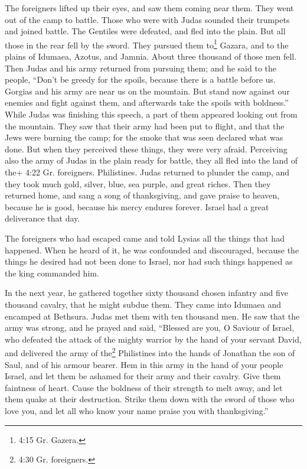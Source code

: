  The foreigners lifted up their eyes, and saw them coming
near them.  They went out of the camp to battle. Those who
were with Judas sounded their trumpets  and joined battle.
The Gentiles were defeated, and fled into the plain.  But
all those in the rear fell by the sword. They pursued them to\footnote{4:15
  Gr. Gazera.} Gazara, and to the plains of Idumaea, Azotus, and Jamnia.
About three thousand of those men fell.  Then Judas and his
army returned from pursuing them;  and he said to the
people, ``Don't be greedy for the spoils, because there is a battle
before us.  Gorgias and his army are near us on the
mountain. But stand now against our enemies and fight against them, and
afterwards take the spoils with boldness.''  While Judas
was finishing this speech, a part of them appeared looking out from the
mountain.  They saw that their army had been put to flight,
and that the Jews were burning the camp; for the smoke that was seen
declared what was done.  But when they perceived these
things, they were very afraid. Perceiving also the army of Judas in the
plain ready for battle,  they all fled into the land of
the+ 4:22 Gr. foreigners. Philistines.  Judas returned to
plunder the camp, and they took much gold, silver, blue, sea purple, and
great riches.  Then they returned home, and sang a song of
thanksgiving, and gave praise to heaven, because he is good, because his
mercy endures forever.  Israel had a great deliverance that
day.

 The foreigners who had escaped came and told Lysias all
the things that had happened.  When he heard of it, he was
confounded and discouraged, because the things he desired had not been
done to Israel, nor had such things happened as the king commanded him.

 In the next year, he gathered together sixty thousand
chosen infantry and five thousand cavalry, that he might subdue them.
 They came into Idumaea and encamped at Bethsura. Judas met
them with ten thousand men.  He saw that the army was
strong, and he prayed and said, ``Blessed are you, O Saviour of Israel,
who defeated the attack of the mighty warrior by the hand of your
servant David, and delivered the army of the\footnote{4:30 Gr.
  foreigners.} Philistines into the hands of Jonathan the son of Saul,
and of his armour bearer.  Hem in this army in the hand of
your people Israel, and let them be ashamed for their army and their
cavalry.  Give them faintness of heart. Cause the boldness
of their strength to melt away, and let them quake at their destruction.
 Strike them down with the sword of those who love you, and
let all who know your name praise you with thanksgiving.''

